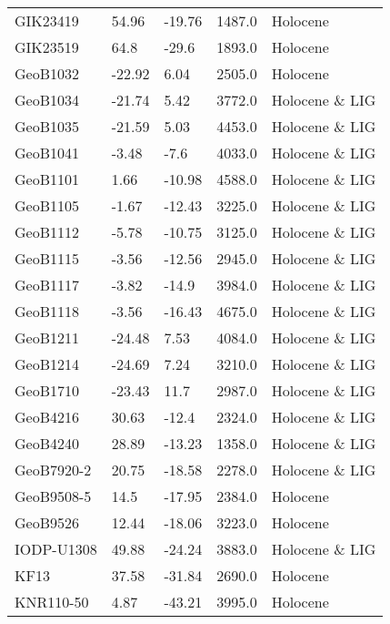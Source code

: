\begin{longtable}{lllrl}
         GIK23419 &    54.96 &    -19.76 &     1487.0 &        Holocene \\
         GIK23519 &     64.8 &     -29.6 &     1893.0 &        Holocene \\
         GeoB1032 &   -22.92 &      6.04 &     2505.0 &        Holocene \\
         GeoB1034 &   -21.74 &      5.42 &     3772.0 &  Holocene \& LIG \\
         GeoB1035 &   -21.59 &      5.03 &     4453.0 &  Holocene \& LIG \\
         GeoB1041 &    -3.48 &      -7.6 &     4033.0 &  Holocene \& LIG \\
         GeoB1101 &     1.66 &    -10.98 &     4588.0 &  Holocene \& LIG \\
         GeoB1105 &    -1.67 &    -12.43 &     3225.0 &  Holocene \& LIG \\
         GeoB1112 &    -5.78 &    -10.75 &     3125.0 &  Holocene \& LIG \\
         GeoB1115 &    -3.56 &    -12.56 &     2945.0 &  Holocene \& LIG \\
         GeoB1117 &    -3.82 &     -14.9 &     3984.0 &  Holocene \& LIG \\
         GeoB1118 &    -3.56 &    -16.43 &     4675.0 &  Holocene \& LIG \\
         GeoB1211 &   -24.48 &      7.53 &     4084.0 &  Holocene \& LIG \\
         GeoB1214 &   -24.69 &      7.24 &     3210.0 &  Holocene \& LIG \\
         GeoB1710 &   -23.43 &      11.7 &     2987.0 &  Holocene \& LIG \\
         GeoB4216 &    30.63 &     -12.4 &     2324.0 &  Holocene \& LIG \\
         GeoB4240 &    28.89 &    -13.23 &     1358.0 &  Holocene \& LIG \\
       GeoB7920-2 &    20.75 &    -18.58 &     2278.0 &  Holocene \& LIG \\
       GeoB9508-5 &     14.5 &    -17.95 &     2384.0 &        Holocene \\
         GeoB9526 &    12.44 &    -18.06 &     3223.0 &        Holocene \\
       IODP-U1308 &    49.88 &    -24.24 &     3883.0 &  Holocene \& LIG \\
             KF13 &    37.58 &    -31.84 &     2690.0 &        Holocene \\
        KNR110-50 &     4.87 &    -43.21 &     3995.0 &        Holocene \\

\end{longtable}
